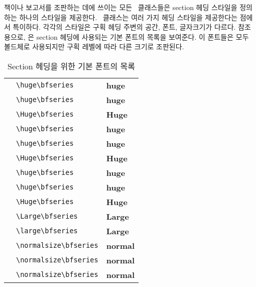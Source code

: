 책이나 보고서를 조판하는 데에 쓰이는 모든 \ltx\ 클래스들은
section 헤딩 스타일을 정의하는 하나의 스타일을 제공한다.
\Mname\ 클래스는 여러 가지 헤딩 스타일을 제공한다는 점에서 특이하다.
각각의 스타일은 구획 헤딩 주변의 공간, 폰트, 글자크기가 다르다.
참조용으로, 은 section 헤딩에 사용되는 기본 폰트의 목록을 보여준다.
이 폰트들은 모두 볼드체로 사용되지만 구획 레벨에 따라 다른 크기로 조판된다.


\begin{table}
\centering
\caption{Section 헤딩을 위한 기본 폰트의 목록}\label{tab:secfonts}
\begin{tabular}{lll} \toprule
\cmd{\booknamefont}       & \verb?\huge\bfseries? & \huge\bfseries huge \\
\cmd{\booknumfont}        & \verb?\huge\bfseries? & \huge\bfseries huge \\
\cmd{\booktitlefont}      & \verb?\Huge\bfseries? & \Huge\bfseries Huge \\
\cmd{\partnamefont}       & \verb?\huge\bfseries? & \huge\bfseries huge \\
\cmd{\partnumfont}        & \verb?\huge\bfseries? & \huge\bfseries huge \\
\cmd{\parttitlefont}      & \verb?\Huge\bfseries? & \Huge\bfseries Huge \\
\cmd{\chapnamefont}       & \verb?\huge\bfseries? & \huge\bfseries huge \\
\cmd{\chapnumfont}        & \verb?\huge\bfseries? & \huge\bfseries huge \\
\cmd{\chaptitlefont}      & \verb?\Huge\bfseries? & \Huge\bfseries Huge \\
\cmd{\secheadstyle}       & \verb?\Large\bfseries? & \Large\bfseries Large \\
\cmd{\subsecheadstyle}    & \verb?\large\bfseries? & \Large\bfseries Large \\
\cmd{\subsubsecheadstyle} & \verb?\normalsize\bfseries? & \bfseries normal \\
\cmd{\paraheadstyle}      & \verb?\normalsize\bfseries? & \bfseries normal \\
\cmd{\subparaheadstyle}   & \verb?\normalsize\bfseries? & \bfseries normal \\
\bottomrule
\end{tabular}
\end{table}


